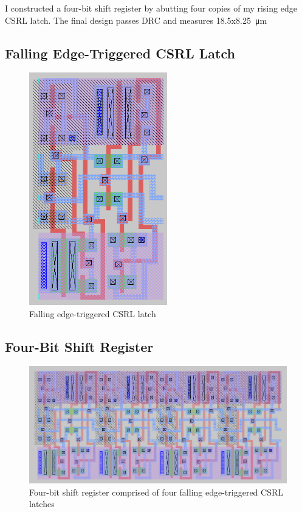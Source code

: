 \documentclass[11pt]{article}
\begin{document}
I constructed a four-bit shift register by abutting four copies of my rising edge CSRL latch. The final design passes DRC and measures 18.5x\qty{8.25}{\micro\meter}

\subsection*{Falling Edge-Triggered CSRL Latch}
\begin{figure}[H]
  \centering
  \includegraphics[width=6cm]{media/csrl_edge.png}
  \caption{Falling edge-triggered CSRL latch}
\end{figure}

\subsection*{Four-Bit Shift Register}
\begin{figure}[H]
  \centering
  \includegraphics[width=\linewidth]{media/shift_register.png}
  \caption{Four-bit shift register comprised of four falling edge-triggered CSRL latches }
\end{figure}
\end{document}

